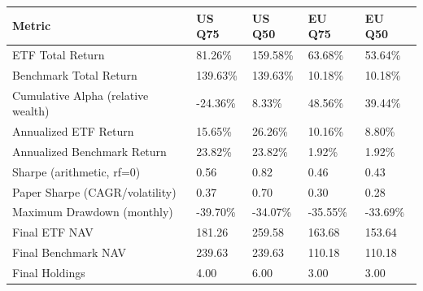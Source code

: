 \begin{longtable}{lllll}
Metric & US Q75 & US Q50 & EU Q75 & EU Q50 \\
\hline
ETF Total Return & 81.26\% & 159.58\% & 63.68\% & 53.64\% \\
Benchmark Total Return & 139.63\% & 139.63\% & 10.18\% & 10.18\% \\
Cumulative Alpha (relative wealth) & -24.36\% & 8.33\% & 48.56\% & 39.44\% \\
Annualized ETF Return & 15.65\% & 26.26\% & 10.16\% & 8.80\% \\
Annualized Benchmark Return & 23.82\% & 23.82\% & 1.92\% & 1.92\% \\
Sharpe (arithmetic, rf=0) & 0.56 & 0.82 & 0.46 & 0.43 \\
Paper Sharpe (CAGR/volatility) & 0.37 & 0.70 & 0.30 & 0.28 \\
Maximum Drawdown (monthly) & -39.70\% & -34.07\% & -35.55\% & -33.69\% \\
Final ETF NAV & 181.26 & 259.58 & 163.68 & 153.64 \\
Final Benchmark NAV & 239.63 & 239.63 & 110.18 & 110.18 \\
Final Holdings & 4.00 & 6.00 & 3.00 & 3.00 \\
\end{longtable}
